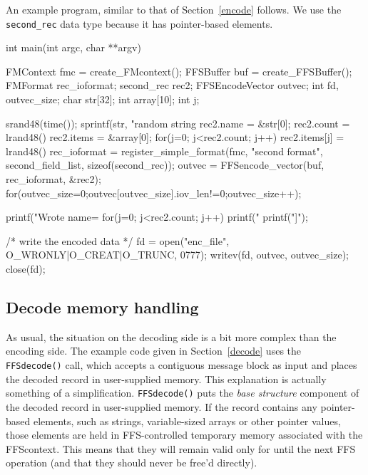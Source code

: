 An example program, similar to that of Section~\ref{encode} follows.  We use
the {\tt second\_rec} data type because it has pointer-based elements.
\begin{Code}
int main(int argc, char **argv)
{
    FMContext fmc = create_FMcontext();
    FFSBuffer buf = create_FFSBuffer();
    FMFormat rec_ioformat;
    second_rec rec2;
    FFSEncodeVector outvec;
    int fd, outvec_size;
    char str[32];
    int array[10];
    int j;

    srand48(time());
    sprintf(str, "random string %
    rec2.name = &str[0];
    rec2.count = lrand48()%
    rec2.items = &array[0];
    for(j=0; j<rec2.count; j++) rec2.items[j] = lrand48()%
    rec_ioformat = register_simple_format(fmc, "second format", second_field_list, sizeof(second_rec));
    outvec = FFSencode_vector(buf, rec_ioformat, &rec2);
    for(outvec_size=0;outvec[outvec_size].iov_len!=0;outvec_size++);

    printf("Wrote name=%
    for(j=0; j<rec2.count; j++) printf("%
    printf("]\n");

    /* write the encoded data */
    fd = open("enc_file", O_WRONLY|O_CREAT|O_TRUNC, 0777);
    writev(fd, outvec, outvec_size);
    close(fd);
}
\end{Code}
\subsection{Decode memory handling}

As usual, the situation on the decoding side is a bit more complex than the
encoding side.  The example code given in Section~\ref{decode} uses the {\tt
  FFSdecode()} call, which accepts a contiguous message block as input and
places the decoded record in user-supplied memory.  This explanation is actually
something of a simplification.  {\tt FFSdecode()} puts the {\it base
  structure} component of the decoded record in user-supplied memory.  If
the record contains any pointer-based elements, such as strings,
variable-sized arrays or other pointer values, those elements are held in
FFS-controlled temporary memory associated with the FFScontext.  This means
that they will remain valid only for until the next FFS operation (and that
they should never be free'd directly).

